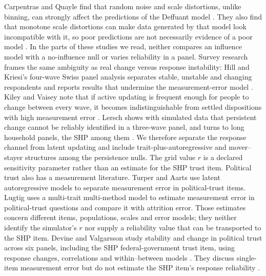 Carpentras and Quayle find that random noise and scale distortions, unlike binning, can strongly affect the predictions of the Deffuant model \cite{carpentras2022}. They also find that monotone scale distortions can make data generated by that model look incompatible with it, so poor predictions are not necessarily evidence of a poor model \cite{carpentras2023}.
In the parts of these studies we read, neither compares an influence model with a no-influence null or varies reliability in a panel.
Survey research frames the same ambiguity as real change versus response instability: Hill and Kriesi's four-wave Swiss panel analysis separates stable, unstable and changing respondents and reports results that undermine the measurement-error model \cite{hill2001,hillkriesi2001}.
Kiley and Vaisey note that if active updating is frequent enough for people to change between every wave, it becomes indistinguishable from settled dispositions with high measurement error \cite{kiley2020}.
Lersch shows with simulated data that persistent change cannot be reliably identified in a three-wave panel, and turns to long household panels, the SHP among them \cite{lersch2023}.
We therefore separate the response channel from latent updating and include trait-plus-autoregressive and mover--stayer structures among the persistence nulls.
The grid value $r$ is a declared sensitivity parameter rather than an estimate for the SHP trust item.
Political trust also has a measurement literature. Turper and Aarts \cite{turper2017} use latent autoregressive models to separate measurement error in political-trust items. Lugtig \cite{lugtig2017} uses a multi-trait multi-method model to estimate measurement error in political-trust questions and compare it with attrition error.
Those estimates concern different items, populations, scales and error models; they neither identify the simulator's $r$ nor supply a reliability value that can be transported to the SHP item.
Devine and Valgar{\dh}sson study stability and change in political trust across six panels, including the SHP federal-government trust item, using response changes, correlations and within--between models \cite{devine2024trust}.
They discuss single-item measurement error but do not estimate the SHP item's response reliability \cite{devine2024trust}.

